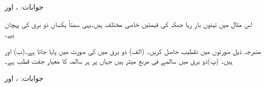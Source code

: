 جوابات: ،  اور 

اس مثال میں تینوں بار  رہا جبکہ  کی قیمتیں خاصی مختلف ہیں۔یہی سمتاً یکساں ذو برق کی پہچان ہے۔
 
مندرجہ ذیل صورتوں میں تقطیب حاصل کریں۔ (الف) ذو برق میں  کی صورت میں  پایا جاتا ہے۔(ب)  اور  ہیں۔ (پ)ذو برق میں   سالمے  فی مربع میٹر ہیں جہاں  پر  ہر سالمہ  کا معیار جفت قطب   ہے۔ 

جوابات: ،  اور 

